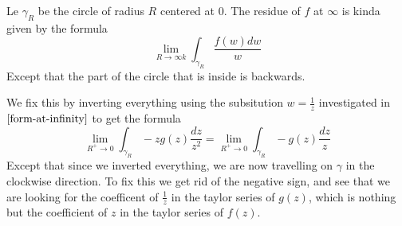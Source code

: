 \documentclass{homework}
\begin{document}
                                                                                                                                   \begin{solution}
                                                                                                                                   Le $\gamma_R$ be the circle of radius $R$ centered at 0.
                                                                                                                                   The residue of $f$ at $\infty$ is kinda given by the formula
                                                                                                                                   \[
                                                                                                                                   \lim_{R \to \infty k} \int_{\gamma_R} \frac{f(w)dw}{w}
                                                                                                                                   \]
                                                                                                                                   Except that the part of the circle that is inside is backwards.

                                                                                                                                   We fix this by inverting everything using the subsitution $w=\frac{1}{z}$ investigated in $\ref{form-at-infinity}$ to get the formula
                                                                                                                                   \[
                                                                                                                                   \lim_{R^+\to 0} \int_{\gamma_R} -zg(z)\frac{dz}{z^2} = \lim_{R^+\to 0} \int_{\gamma_R} -g(z)\frac{dz}{z} 
                                                                                                                                   \]
                                                                                                                                   Except that since we inverted everything, we are now travelling on $\gamma$ in the clockwise direction. To fix this we get rid of the negative sign, and see that we are looking for the coefficent of $\frac{1}{z}$ in the taylor series of $g(z)$, which is nothing but the coefficient of $z$ in the taylor series of $f(z)$.
                                                                                                                                   \end{solution}
\end{document}
